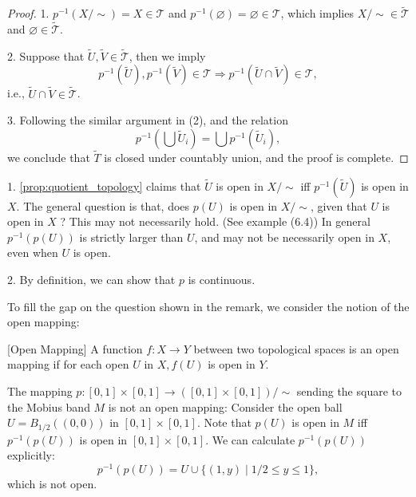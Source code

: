 \begin{proof} 1. \({p}^{-1}\left( {X/ \sim  }\right)  = X \in  \mathcal{T}\) and \({p}^{-1}\left( \varnothing \right)  = \varnothing  \in  \mathcal{T}\), which implies \(X/ \sim   \in  \widetilde{\mathcal{T}}\) and \(\varnothing  \in  \widetilde{\mathcal{T}}\).

2. Suppose that \(\widetilde{U},\widetilde{V} \in  \widetilde{\mathcal{T}}\), then we imply
\[
{p}^{-1}\left( \widetilde{U}\right),{p}^{-1}\left( \widetilde{V}\right)  \in  \mathcal{T} \Rightarrow  {p}^{-1}\left( {\widetilde{U} \cap  \widetilde{V}}\right)  \in  \mathcal{T},
\]
i.e., \(\widetilde{U} \cap  \widetilde{V} \in  \widetilde{\mathcal{T}}\).

3. Following the similar argument in (2), and the relation
\[
{p}^{-1}\left( {\bigcup {\widetilde{U}}_{i}}\right)  = \bigcup {p}^{-1}\left( {\widetilde{U}}_{i}\right),
\]
we conclude that \(\widetilde{T}\) is closed under countably union, and the proof is complete.
\end{proof}

\begin{remark}
1. \autoref{prop:quotient_topology} claims that \(\widetilde{U}\) is open in \(X/ \sim\) iff \({p}^{-1}\left( \widetilde{U}\right)\) is open in \(X\). The general question is that, does \(p\left( U\right)\) is open in \(X/ \sim\), given that \(U\) is open in \(X\) ? This may not necessarily hold. (See example (6.4)) In general \({p}^{-1}\left( {p\left( U\right) }\right)\) is strictly larger than \(U\), and may not be necessarily open in \(X\), even when \(U\) is open.

2. By definition, we can show that \(p\) is continuous.
\end{remark}

To fill the gap on the question shown in the remark, we consider the notion of the open mapping:
\begin{definition}\label{def:open_mapping} [Open Mapping] A function \(f: X \rightarrow  Y\) between two topological spaces is an open mapping if for each open \(U\) in \(X,f\left( U\right)\) is open in \(Y\).
\end{definition}


\begin{example} The mapping \(p: \left\lbrack  {0,1}\right\rbrack   \times  \left\lbrack  {0,1}\right\rbrack   \rightarrow  \left( {\left\lbrack  {0,1}\right\rbrack   \times  \left\lbrack  {0,1}\right\rbrack  }\right) / \sim\) sending the square to the Mobius band \(M\) is not an open mapping: Consider the open ball \(U = {B}_{1/2}\left( \left( {0,0}\right) \right)\) in \(\left\lbrack  {0,1}\right\rbrack   \times  \left\lbrack  {0,1}\right\rbrack\). Note that \(p\left( U\right)\) is open in \(M\) iff \({p}^{-1}\left( {p\left( U\right) }\right)\) is open in \(\left\lbrack  {0,1}\right\rbrack   \times  \left\lbrack  {0,1}\right\rbrack\). We can calculate \({p}^{-1}\left( {p\left( U\right) }\right)\) explicitly:
\[
{p}^{-1}\left( {p\left( U\right) }\right)  = U \cup  \{ \left( {1,y}\right)  \mid  1/2 \leq  y \leq  1\},
\]
which is not open.
\end{example}


